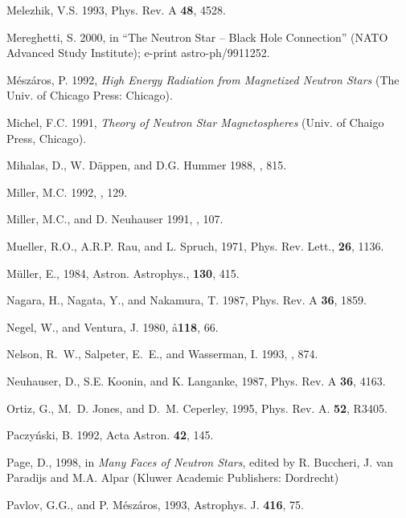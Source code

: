 \begin{references}
\harvarditem{}{}{}
Melezhik, V.S. 1993, Phys. Rev. A {\bf 48}, 4528.

\harvarditem{}{}{}
Mereghetti, S. 2000, in ``The Neutron Star -- Black Hole Connection'' (NATO
Advanced Study Institute); e-print astro-ph/9911252.

\harvarditem{}{}{}
M\'esz\'aros, P. 1992, {\it High Energy Radiation from Magnetized Neutron
Stars} (The Univ. of Chicago Press: Chicago).

\harvarditem{}{}{}
Michel, F.C. 1991, {\it Theory of Neutron Star Magnetospheres} (Univ. of 
Chaigo Press, Chicago).

\harvarditem{}{}{}
Mihalas, D., W. D\"appen, and D.G. Hummer 1988, , 815.

\harvarditem{}{}{}
Miller, M.C. 1992, , 129.

\harvarditem{}{}{}
Miller, M.C., and D. Neuhauser 1991, , 107.

\harvarditem{}{}{}
Mueller, R.O., A.R.P. Rau, and L. Spruch, 1971, Phys. Rev. Lett., 
{\bf 26}, 1136.

\harvarditem{}{}{}
M\"uller, E., 1984, Astron. Astrophys., {\bf 130}, 415.

\harvarditem{}{}{}
Nagara, H., Nagata, Y., and Nakamura, T. 1987, Phys. Rev. A {\bf 36}, 1859.

\harvarditem{}{}{}
Negel, W., and Ventura, J. 1980, \aa {\bf 118}, 66.

\harvarditem{}{}{}
Nelson, R.~W., Salpeter, E.~E., and Wasserman, I. 1993, , 874.

\harvarditem{}{}{}
Neuhauser, D., S.E. Koonin, and K. Langanke, 1987, Phys. Rev. A {\bf 36}, 
4163.

\harvarditem{}{}{}
Ortiz, G., M.~D. Jones, and D.~M. Ceperley, 1995, Phys. Rev. A. {\bf 52},
R3405.

\harvarditem{}{}{}
Paczy\'nski, B. 1992, Acta Astron. {\bf 42}, 145.

\harvarditem{}{}{}
Page, D., 1998, in {\it Many Faces of Neutron Stars}, edited by R. Buccheri,
J. van Paradijs and M.A. Alpar (Kluwer Academic Publishers:
Dordrecht)

\harvarditem{}{}{}
Pavlov, G.G., and P. M\'esz\'aros, 1993, Astrophys. J. {\bf 416}, 75.


\end{references}
